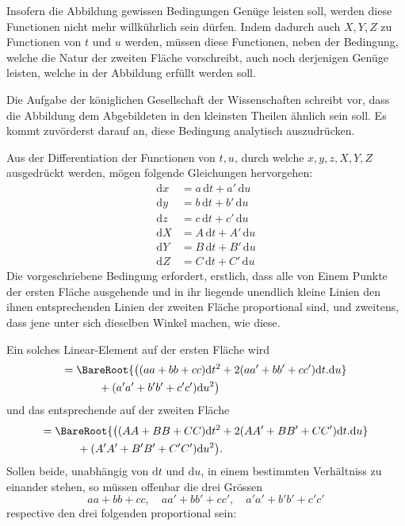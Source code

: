 Insofern die Abbildung gewissen Bedingungen Genüge leisten soll, werden diese Functionen nicht mehr willkührlich sein dürfen. Indem dadurch auch \(X,Y,Z\) zu Functionen von \(t\) und \(u\) werden, müssen diese Functionen, neben der Bedingung, welche die Natur der zweiten Fläche vorschreibt, auch noch derjenigen Genüge leisten, welche in der Abbildung erfüllt werden soll.

Die Aufgabe der königlichen Gesellschaft der Wissenschaften schreibt vor, dass die Abbildung dem Abgebildeten in den kleinsten Theilen ähnlich sein soll. Es kommt zuvörderst darauf an, diese Bedingung analytisch auszudrücken.

Aus der Differentiation der Functionen von \(t,u\), durch welche \(x,\allowbreak y,\allowbreak z,\allowbreak X,\allowbreak Y,\allowbreak Z\) ausgedrückt werden, mögen folgende Gleichungen hervorgehen:
\[
\begin{aligned}
\mathrm{d}x&=a\,\mathrm{d}t+a'\,\mathrm{d}u\\
\mathrm{d}y&=b\,\mathrm{d}t+b'\,\mathrm{d}u\\
\mathrm{d}z&=c\,\mathrm{d}t+c'\,\mathrm{d}u\\
\mathrm{d}X&=A\,\mathrm{d}t+A'\,\mathrm{d}u\\
\mathrm{d}Y&=B\,\mathrm{d}t+B'\,\mathrm{d}u\\
\mathrm{d}Z&=C\,\mathrm{d}t+C'\,\mathrm{d}u
\end{aligned}
\]
\noindent Die vorgeschriebene Bedingung erfordert, erstlich, dass alle von Einem Punkte der ersten Fläche ausgehende und in ihr liegende unendlich kleine Linien den ihnen entsprechenden Linien der zweiten Fläche proportional sind, und zweitens, dass jene unter sich dieselben Winkel machen, wie diese.

Ein solches Linear-Element auf der ersten Fläche wird
\[
\begin{aligned}
={}&\BareRoot{\bigl((aa+bb+cc)\mathrm{d}t^2+2(aa'+bb'+cc')\mathrm{d}t\mathord{.}\mathrm{d}u}\\
&\qquad+(a'a'+b'b'+c'c')\mathrm{d}u^2\bigr)
\end{aligned}
\]
\noindent und das entsprechende auf der zweiten Fläche
\[
\begin{aligned}
={}&\BareRoot{\bigl((AA+BB+CC)\mathrm{d}t^2+2(AA'+BB'+CC')\mathrm{d}t\mathord{.}\mathrm{d}u}\\
&\qquad+(A'A'+B'B'+C'C')\mathrm{d}u^2\bigr).
\end{aligned}
\]
\noindent Sollen beide, unabhängig von \(\mathrm{d}t\) und \(\mathrm{d}u\), in einem bestimmten Verhältniss zu einander stehen, so müssen offenbar die drei Grössen
\[
aa+bb+cc,\quad aa'+bb'+cc',\quad a'a'+b'b'+c'c'
\]
\noindent respective den drei folgenden proportional sein:
